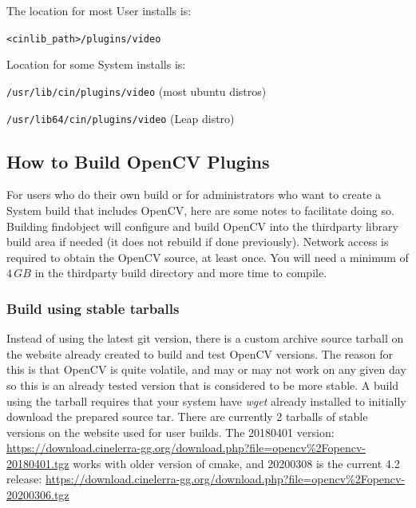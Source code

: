 The location for most User installs is:

\hspace{4em}\texttt{<cinlib\_path>/plugins/video}

Location for some System installs is:

\hspace{4em}\texttt{/usr/lib/cin/plugins/video} (most ubuntu distros)

\hspace{4em}\texttt{/usr/lib64/cin/plugins/video} (Leap distro)

\subsection{How to Build OpenCV Plugins}%
\label{sub:how_build_opencv_plugins}

For users who do their own build or for administrators who want to create a System build that
includes OpenCV, here are some notes to facilitate doing so.  Building findobject will configure
and build OpenCV into the thirdparty library build area if needed (it does not rebuild if done
previously).  Network access is required to obtain the OpenCV source, at least once. You will
need a minimum of $4\, GB$ in the thirdparty build directory and more time to compile.

\subsubsection*{Build using stable tarballs}%
\label{ssub:stable_tars}

Instead of using the latest git version, there is a custom archive source tarball on the
website already created to build and test OpenCV versions.  The reason for this is that OpenCV
is quite volatile, and may or may not work on any given day so this is an already tested version
that is considered to be more stable.  A build using the tarball requires that your
system have \textit{wget} already installed to initially download the prepared source tar. 
There are currently 2 tarballs of stable versions on the website used for user builds.
The 20180401 version:\newline
{\small \url{https://download.cinelerra-gg.org/download.php?file=opencv\%2Fopencv-20180401.tgz}}\newline 
works with older version of cmake, and 20200308 is the current 4.2 release:\newline
{\small \url{https://download.cinelerra-gg.org/download.php?file=opencv\%2Fopencv-20200306.tgz}}

